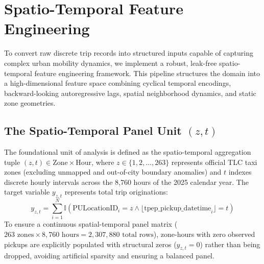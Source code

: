 \documentclass[11pt,a4paper]{article}
\begin{document}
\section{Spatio-Temporal Feature Engineering}
To convert raw discrete trip records into structured inputs capable of capturing complex urban mobility dynamics, we implement a robust, leak-free spatio-temporal feature engineering framework. This pipeline structures the domain into a high-dimensional feature space combining cyclical temporal encodings, backward-looking autoregressive lags, spatial neighborhood dynamics, and static zone geometries.

\subsection{The Spatio-Temporal Panel Unit $(z, t)$}
The foundational unit of analysis is defined as the spatio-temporal aggregation tuple $(z, t) \in \text{Zone} \times \text{Hour}$, where $z \in \{1, 2, \dots, 263\}$ represents official TLC taxi zones (excluding unmapped and out-of-city boundary anomalies) and $t$ indexes discrete hourly intervals across the 8,760 hours of the 2025 calendar year. The target variable $y_{z,t}$ represents total trip originations:
\begin{equation}
y_{z,t} = \sum_{i=1}^{N} \mathbb{I}\left(\text{PULocationID}_i = z \land \lfloor \text{tpep\_pickup\_datetime}_i \rfloor = t\right)
\end{equation}
To ensure a continuous spatial-temporal panel matrix ($263 \text{ zones} \times 8,760 \text{ hours} = 2,307,880 \text{ total rows}$), zone-hours with zero observed pickups are explicitly populated with structural zeros ($y_{z,t} = 0$) rather than being dropped, avoiding artificial sparsity and ensuring a balanced panel.
\end{document}
